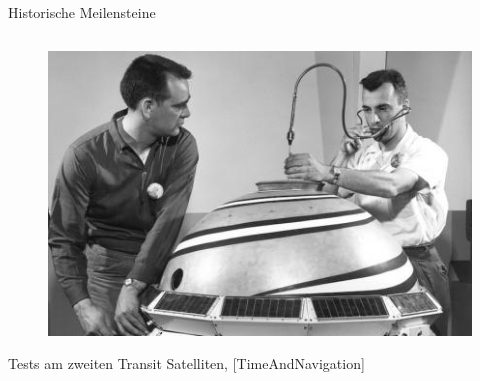 \begin{frame}{Historische Meilensteine}
\begin{columns}
\begin{column}{0.35\textwidth}
\begin{figure}
                   \includegraphics[width=0.35\paperwidth]{images/transit-satellite.jpg}
               \end{figure}
               Tests am zweiten Transit Satelliten, {\small [TimeAndNavigation]}
           \end{column}
       \end{columns}
   \end{frame}
